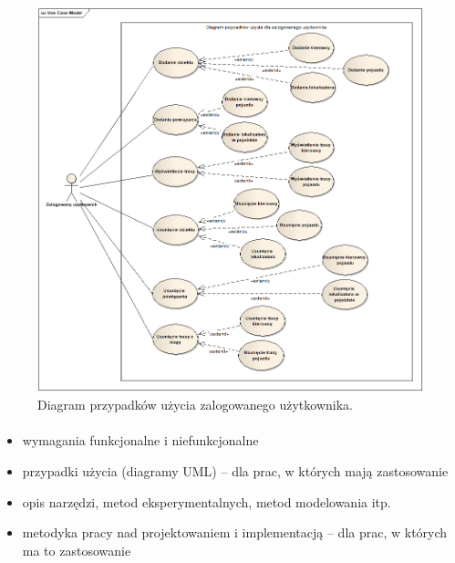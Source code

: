 \begin{figure}
\centering
\includegraphics[width=1\textwidth]{./graf/Przypadki_uzycia_zalogowany.png}
\caption{Diagram przypadków użycia zalogowanego użytkownika.}
\label{fig:2}
\end{figure}

\paragraph{}


\begin{itemize}
\item wymagania funkcjonalne i niefunkcjonalne
\item przypadki użycia (diagramy UML) -- dla prac, w których mają zastosowanie
\item opis narzędzi, metod eksperymentalnych, metod modelowania itp.
\item metodyka pracy nad projektowaniem i implementacją -- dla prac, w których ma to zastosowanie
\end{itemize}
